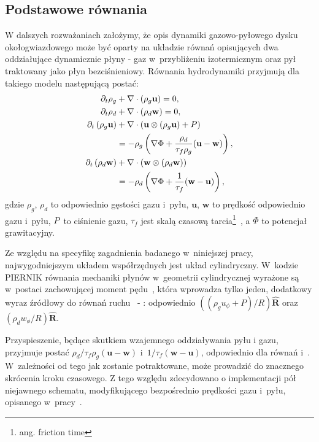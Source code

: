 \subsection{Podstawowe równania}
W dalszych rozważaniach założymy, że opis dynamiki gazowo-pyłowego dysku
okołogwiazdowego może być oparty na układzie równań opisujących dwa oddziałujące
dynamicznie płyny - gaz w~przybliżeniu izotermicznym oraz  pył traktowany jako
płyn bezciśnieniowy. Równania hydrodynamiki przyjmują dla takiego modelu
następującą postać:
%
\begin{align}
   \partial_t \rho_g &+ \nabla\cdot\left(\rho_g\mathbf{u}\right) = 0,\label{eq1}\\
   \partial_t \rho_d &+ \nabla\cdot\left(\rho_d\mathbf{w}\right) = 0,\label{eq2}\\
\partial_t \left(\rho_g\mathbf{u}\right) &+
   \nabla\cdot(\mathbf{u}\otimes(\rho_g\mathbf{u})+P) \notag\\
 &= -\rho_g\left(\nabla\Phi +
\frac{\rho_d}{\tau_f\rho_g}(\mathbf{u}-\mathbf{w})\right),\label{eq3}\\
\partial_t \left(\rho_d\mathbf{w}\right) &+
\nabla\cdot(\mathbf{w}\otimes(\rho_d\mathbf{w})) \notag\\
 &= -\rho_d\left(\nabla\Phi + \frac{1}{\tau_f}(\mathbf{w}-\mathbf{u})\right),
\label{eq4}
\end{align}
gdzie $\rho_g$, $\rho_d$ to odpowiednio gęstości gazu i~pyłu, $\mathbf{u}$,
$\mathbf{w}$ to prędkość odpowiednio gazu i~pyłu, $P$~to ciśnienie gazu,
$\tau_f$ jest skalą czasową tarcia\footnote{ang. friction time}~,
a $\Phi$ to potencjał grawitacyjny.
%
\par Ze względu na specyfikę zagadnienia badanego w~niniejszej pracy,
najwygodniejszym układem współrzędnych jest układ cylindryczny. W~kodzie
\textsc{PIERNIK}
równania mechaniki płynów w~geometrii cylindrycznej wyrażone są w~postaci
zachowującej moment pędu~\cite{M07,SO10}, która wprowadza tylko jeden, dodatkowy
wyraz źródłowy do równań ruchu~ - : odpowiednio
$\left((\rho_g u_\phi + P) / R\right)\mathbf{\hat{R}}$ oraz $(\rho_d w_\phi / R)
\mathbf{\hat{R}}$.
%
\par Przyspieszenie, będące skutkiem wzajemnego oddziaływania pyłu i gazu,
przyjmuje postać $\rho_d/\tau_f\rho_g(\mathbf{u}-\mathbf{w})$
i~$1/\tau_f(\mathbf{w}-\mathbf{u})$, odpowiednio dla równań 
i~. W~zależności od tego jak zostanie potraktowane, może prowadzić do
znacznego skrócenia kroku czasowego. Z tego względu zdecydowano o implementacji
pół niejawnego schematu, modyfikującego bezpośrednio prędkości gazu i~pyłu,
opisanego w~pracy~\cite{TB09}.
%
